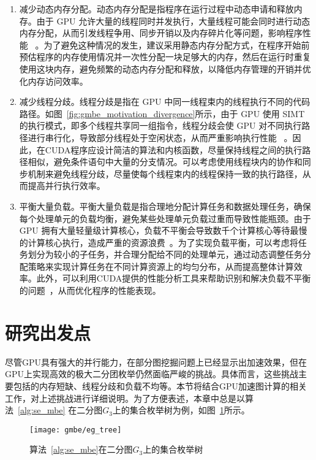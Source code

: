 \begin{enumerate}
  \item 减少动态内存分配。动态内存分配是指程序在运行过程中动态申请和释放内存。由于 GPU 允许大量的线程同时并发执行，大量线程可能会同时进行动态内存分配，从而引发线程争用、同步开销以及内存碎片化等问题，影响程序性能 ~\cite{DynamicMallocGpu21}。为了避免这种情况的发生，建议采用静态内存分配方式，在程序开始前预估程序的内存使用情况并一次性分配一块足够大的内存，然后在运行时重复使用这块内存，避免频繁的动态内存分配和释放，以降低内存管理的开销并优化内存访问效率。
  
  \item 减少线程分歧。线程分歧是指在 GPU 中同一线程束内的线程执行不同的代码路径。如图~\ref{fig:gmbe_motivation_divergence}所示，由于 GPU 使用 SIMT 的执行模式，即多个线程共享同一组指令，线程分歧会使 GPU 对不同执行路径进行串行化，导致部分线程处于空闲状态，从而严重影响执行性能 ~\cite{CUDAProgrammingGuide}。因此，在CUDA程序应设计简洁的算法和内核函数，尽量保持线程之间的执行路径相似，避免条件语句中大量的分支情况。可以考虑使用线程块内的协作和同步机制来避免线程分歧，尽量使每个线程束内的线程保持一致的执行路径，从而提高并行执行效率。
  

  \item 平衡大量负载。平衡大量负载是指合理地分配计算任务和数据处理任务，确保每个处理单元的负载均衡，避免某些处理单元负载过重而导致性能瓶颈。由于 GPU 拥有大量轻量级计算核心，负载不平衡会导致数千个计算核心等待最慢的计算核心执行，造成严重的资源浪费~\cite{CUDAProgrammingGuide}。为了实现负载平衡，可以考虑将任务划分为较小的子任务，并合理分配给不同的处理单元，通过动态调整任务分配策略来实现计算任务在不同计算资源上的均匀分布，从而提高整体计算效率。此外，可以利用CUDA提供的性能分析工具来帮助识别和解决负载不平衡的问题~\cite{Nsight,CUDANsightSystems,CUDANsightProfile}，从而优化程序的性能表现。
  
\end{enumerate}


\section{研究出发点}

尽管GPU具有强大的并行能力，在部分图挖掘问题上已经显示出加速效果，但在GPU上实现高效的极大二分团枚举仍然面临严峻的挑战。具体而言，这些挑战主要包括的内存短缺、线程分歧和负载不均等。本节将结合GPU加速图计算的相关工作，对上述挑战进行详细说明。为了方便表述，本章中总是以算法~\ref{alg:se_mbe} 在二分图$G_3$上的集合枚举树为例，如图~\ref{fig:gmbe_tree}所示。

\begin{figure} [H]
	\centering
  \vspace{0.1in}
	\texttt{[image: gmbe/eg\_tree]}
  \vspace{0.1in}
	\caption{算法~\ref{alg:se_mbe}在二分图$G_3$上的集合枚举树}

	\label{fig:gmbe_tree}
\end{figure}

